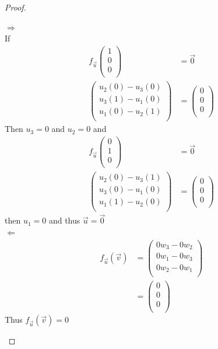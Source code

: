 \documentclass[11pt]{article}
\newcommand{\bproof}{\begin{proof}
$ $ \\
\begin{adjustwidth}{3em}{0pt}
}
\newcommand{\eproof}{\end{adjustwidth}
\end{proof}}
\begin{document}
\begin{flushleft}
\bproof
	$\Rightarrow$ \\
	If \\
	\begin{align*}
	f_{\vec{u}} \begin{pmatrix}
	1 \\
	0 \\
	0 \\
	\end{pmatrix} &= \vec{0} \\
	\begin{pmatrix}
	u_2(0) - u_3(0) \\
	u_3(1) - u_1(0) \\
	u_1(0) - u_2(1) \\
	\end{pmatrix} &= \begin{pmatrix}
	0 \\
	0 \\
	0 \\
	\end{pmatrix}
	\end{align*}
	Then $u_3 = 0$ and $u_2 = 0$ and \\
	\begin{align*}
	f_{\vec{u}} \begin{pmatrix}
	0 \\
	1 \\
	0 \\
	\end{pmatrix} &= \vec{0} \\
	\begin{pmatrix}
	u_2(0) - u_3(1) \\
	u_3(0) - u_1(0) \\
	u_1(1) - u_2(0) \\
	\end{pmatrix} &= \begin{pmatrix}
	0 \\
	0 \\
	0 \\
	\end{pmatrix}
	\end{align*}
	then $u_1 = 0$ and thus $\vec{u} = \vec{0}$ \\ \bigskip
	$\Leftarrow$ \\
	\begin{align*}
	f_{\vec{u}}(\vec{v}) &= \begin{pmatrix}
	0w_3 - 0w_2 \\
	0w_1 - 0w_3 \\
	0w_2 - 0w_1 \\
	\end{pmatrix} \\
	&= \begin{pmatrix}
	0 \\
	0 \\
	0 \\
	\end{pmatrix}
	\end{align*}
	Thus $f_{\vec{u}}(\vec{v}) = 0$

\eproof

\end{flushleft}
\end{document}
